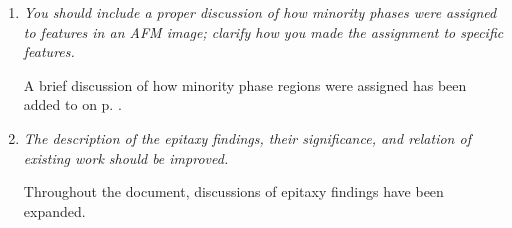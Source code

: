 \documentclass[12pt,%
               letterpaper,
               oneside]{uiothesis}
\begin{document}
\begin{enum}
\begin{enumerate}[label=\alph*,leftmargin=1em]
  \item \emph{You should include a proper discussion of how minority phases were assigned
to features in an AFM image; clarify how you made the assignment to specific
features.}\vspace{8pt}
  
  A brief discussion of how minority phase regions were assigned has been added to
 on p. \pageref{minorityphase}.\vspace{16pt} 
  
  \item \emph{The description of the epitaxy findings, their significance, and relation of
existing work should be improved.}\vspace{8pt}
  
  Throughout the document, discussions of epitaxy findings have been expanded.
  
  \vspace{16pt}
  
\end{enumerate}
  
\end{enum}
\end{document}
